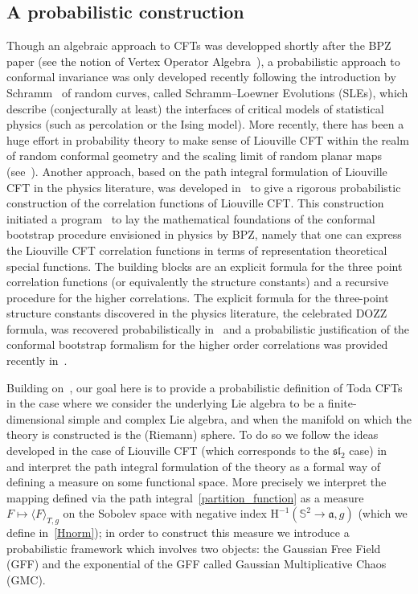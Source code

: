 \documentclass[10pt]{amsart}
\theoremstyle{definition}\newtheorem{defi}[theo]{Definition}\newtheorem{rema}[theo]{Remark}\newtheorem{exam}[theo]{Example}\newtheorem{exem}[theo]{Example}\newtheorem{nota}[theo]{Notation}
\newcommand{\frksl}{\mathfrak{sl}}
\newcommand{\frka}{\mathfrak{a}}
\newcommand{\rmH}{\mathrm{H}}
\renewcommand*\S{\mathbb{S}}
\newcommand{\ps}[1]{\langle #1 \rangle}
\begin{document}
\subsection{A probabilistic construction}
Though an algebraic approach to CFTs was developped shortly after the BPZ paper (see the notion of Vertex Operator Algebra~\cite{Borcherds,FLM89}), a probabilistic approach to conformal invariance was only developed recently following the introduction by Schramm~\cite{schramm} of random curves, called Schramm--Loewner Evolutions (SLEs), which describe (conjecturally at least) the interfaces of critical models of statistical physics (such as percolation or the Ising model). More recently, there has been a huge effort in probability theory to make sense of Liouville CFT within the realm of random conformal geometry and the scaling limit of random planar maps (see~\cite{LeG13,Mie13,GM20,DMS14,DDDF,DFGPS}). Another approach, based on the path integral formulation of Liouville CFT in the physics literature, was developed in~\cite{DKRV,DRV16,HRV16,GRV16} to give a rigorous probabilistic construction of the correlation functions of Liouville CFT. This construction initiated a program~\cite{KRV_loc} to lay the mathematical foundations of the conformal bootstrap procedure envisioned in physics by BPZ, namely that one can express the Liouville CFT correlation functions in terms of representation theoretical special functions. The building blocks are an explicit formula for the three point correlation functions (or equivalently the structure constants) and a recursive procedure for the higher correlations. The explicit formula for the three-point structure constants discovered in the physics literature, the celebrated DOZZ formula, was recovered probabilistically in~\cite{KRV_DOZZ} and a probabilistic justification of the conformal bootstrap formalism for the higher order correlations was provided recently in~\cite{GKRV}.

Building on~\cite{DKRV}, our goal here is to provide a probabilistic definition of Toda CFTs in the case where we consider the underlying Lie algebra to be a finite-dimensional simple and complex Lie algebra, and when the manifold on which the theory is constructed is the (Riemann) sphere. To do so we follow the ideas developed in the case of Liouville CFT (which corresponds to the $\frksl_2$ case) in~\cite{DKRV} and interpret the path integral formulation of the theory as a formal way of defining a measure on some functional space. More precisely we interpret the mapping defined via the path integral~\eqref{partition_function} as a measure $F\mapsto\ps{F}_{T,g}$ on the Sobolev space with negative index $\rmH^{-1}(\S^2\to\frka,g)$ (which we define in~\eqref{Hnorm}); in order to construct this measure we introduce a probabilistic framework which involves two objects: the Gaussian Free Field (GFF) and the exponential of the GFF called Gaussian Multiplicative Chaos (GMC).
\end{document}
